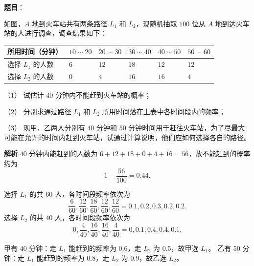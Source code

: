 \begin{answer}

\textbf{题目}：

如图，$A$ 地到火车站共有两条路径 $L_1$ 和 $L_2$，现随机抽取 $100$ 位从 $A$ 地到达火车站的人进行调查，调查结果如下：

\begin{center}
\begin{tabular}{llllll}
\toprule
所用时间（分钟） & $10\sim20$ & $20\sim30$ & $30\sim40$ & $40\sim50$ & $50\sim60$ \\
\midrule
选择 $L_1$ 的人数 & $6$ & $12$ & $18$ & $12$ & $12$ \\
选择 $L_2$ 的人数 & $0$ & $4$ & $16$ & $16$ & $4$ \\
\bottomrule
\end{tabular}
\end{center}

（1） 试估计 $40$ 分钟内不能赶到火车站的概率；

（2） 分别求通过路径 $L_1$ 和 $L_2$ 所用时间落在上表中各时间段内的频率；

（3） 现甲、乙两人分别有 $40$ 分钟和 $50$ 分钟时间用于赶往火车站，为了尽最大可能在允许的时间内赶到火车站，试通过计算说明，他们应如何选择各自的路径。
\nopagebreak[4]
\begin{center}\end{center}
\nopagebreak[4]
\textbf{解析}
$40$ 分钟内能赶到的人数为 $6+12+18+0+4+16=56$，故不能赶到的概率约为
\nopagebreak[4]
\[1-\frac{56}{100}=0.44.\]

选择 $L_1$ 的共 $60$ 人，各时间段频率依次为
\nopagebreak[4]
\[\frac6{60},\frac{12}{60},\frac{18}{60},\frac{12}{60},\frac{12}{60}=0.1,0.2,0.3,0.2,0.2.\]
选择 $L_2$ 的共 $40$ 人，各时间段频率依次为
\nopagebreak[4]
\[0,\frac4{40},\frac{16}{40},\frac{16}{40},\frac4{40}=0,0.1,0.4,0.4,0.1.\]

甲有 $40$ 分钟：走 $L_1$ 能赶到的频率为 $0.6$，走 $L_2$ 为 $0.5$，故甲选 $L_1$。
乙有 $50$ 分钟：走 $L_1$ 能赶到的频率为 $0.8$，走 $L_2$ 为 $0.9$，故乙选 $L_2$。




\end{answer}
